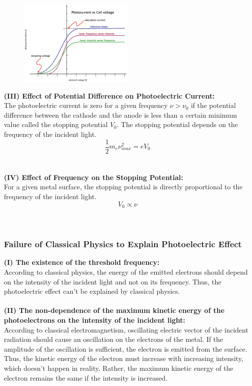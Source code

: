 \documentclass[12pt]{article}
\numberwithin{equation}{subsection}
\begin{document}
\begin{figure}[htpb]
    \centering
    \includegraphics[width=0.5\textwidth]{i vs v.png}
\end{figure}

\textbf{(III) Effect of Potential Difference on Photoelectric Current:} \\
The photoelectric current is zero for a given frequency $\nu > \nu_0$ if the potential difference between the cathode and the anode is less than a certain minimum value called the stopping potential $V_0$. The stopping potential depends on the frequency of the incident light. \[
    \frac{1}{2}m_{e}\nu_{max}^2 = eV_0
\] \\~\\

\textbf{(IV) Effect of Frequency on the Stopping Potential:} \\
For a given metal surface, the stopping potential is directly proportional to the frequency of the incident light. \[
    V_0 \propto \nu
\] \\~\\

\subsubsection{Failure of Classical Physics to Explain Photoelectric Effect}
\textbf{(I) The existence of the threshold frequency:} \\
According to classical physics, the energy of the emitted electrons should depend on the intensity of the incident light and not on its frequency. Thus, the photoelectric effect can't be explained by classical physics. \\~\\

\textbf{(II) The non-dependence of the maximum kinetic energy of the photoelectrons on the intensity of the incident light:} \\
According to classical electromagnetism, oscillating electric vector of the incident radiation should cause an oscillation on the electrons of the metal. If the amplitude of the oscillation is sufficient, the electron is emitted from the surface. Thus, the kinetic energy of the electron must increase with increasing intensity, which doesn't happen in reality. Rather, the maximum kinetic energy of the electron remains the same if the intensity is increased.\\~\\
\end{document}
